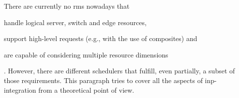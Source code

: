 There are currently no \glspl{rm} nowadays that
\begin{mylist}
    \item handle logical server, switch and edge resources,
    \item support high-level requests (e.g., with the use of composites) and
    \item are capable of considering multiple resource dimensions
\end{mylist}.
However, there are different schedulers that fulfill, even partially, a subset of those requirements.
This paragraph tries to cover all the aspects of \gls{inp}-integration from a theoretical point of view.